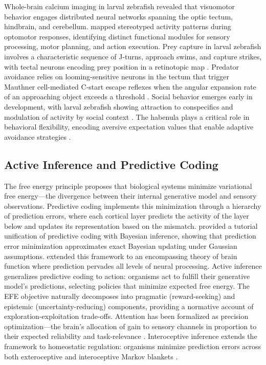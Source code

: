 \documentclass[12pt]{article}
\begin{document}
Whole-brain calcium imaging in larval zebrafish
\citep{ahrens2013} revealed that visuomotor behavior engages
distributed neural networks spanning the optic tectum, hindbrain,
and cerebellum.
\citet{portugues2014} mapped stereotyped activity patterns during
optomotor responses, identifying distinct functional modules for
sensory processing, motor planning, and action execution.
Prey capture in larval zebrafish involves a characteristic sequence
of J-turns, approach swims, and capture strikes, with tectal neurons
encoding prey position in a retinotopic map
\citep{bianco2015}.
Predator avoidance relies on looming-sensitive neurons in the tectum
that trigger Mauthner cell-mediated C-start escape reflexes when the
angular expansion rate of an approaching object exceeds a threshold
\citep{temizer2015,dunn2016}.
Social behavior emerges early in development, with larval zebrafish
showing attraction to conspecifics and modulation of activity by
social context \citep{dreosti2015}.
The habenula plays a critical role in behavioral flexibility, encoding
aversive expectation values that enable adaptive avoidance strategies
\citep{amo2014,jesuthasan2012}.

\subsection{Active Inference and Predictive Coding}

The free energy principle \citep{friston2010} proposes that biological
systems minimize variational free energy---the divergence between their
internal generative model and sensory observations.
Predictive coding \citep{rao1999} implements this minimization through
a hierarchy of prediction errors, where each cortical layer predicts
the activity of the layer below and updates its representation based
on the mismatch.
\citet{bogacz2017} provided a tutorial unification of predictive coding
with Bayesian inference, showing that prediction error minimization
approximates exact Bayesian updating under Gaussian assumptions.
\citet{clark2013} extended this framework to an encompassing theory
of brain function where prediction pervades all levels of neural
processing.
Active inference \citep{friston2017,parr2022} generalizes predictive
coding to action: organisms act to fulfill their generative model's
predictions, selecting policies that minimize expected free energy.
The EFE objective naturally decomposes into pragmatic (reward-seeking)
and epistemic (uncertainty-reducing) components, providing a normative
account of exploration-exploitation trade-offs.
Attention has been formalized as precision optimization---the brain's
allocation of gain to sensory channels in proportion to their expected
reliability and task-relevance \citep{feldman2010}.
Interoceptive inference extends the framework to homeostatic regulation:
organisms minimize prediction errors across both exteroceptive and
interoceptive Markov blankets \citep{seth2016,barrett2015,pezzulo2015}.
\end{document}
